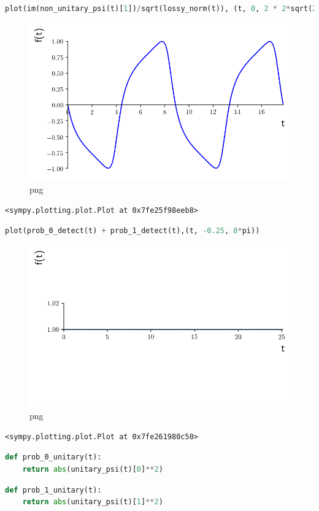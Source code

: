 \begin{lstlisting}[language=Python]
plot(im(non_unitary_psi(t)[1])/sqrt(lossy_norm(t)), (t, 0, 2 * 2*sqrt(2)*pi), line_color='b')
\end{lstlisting}

\begin{figure}
\centering
\includegraphics[width=0.6\linewidth]{output_37_0.png}
\caption{png}
\end{figure}

\begin{lstlisting}
<sympy.plotting.plot.Plot at 0x7fe25f98eeb8>
\end{lstlisting}

\begin{lstlisting}[language=Python]
plot(prob_0_detect(t) + prob_1_detect(t),(t, -0.25, 8*pi))
\end{lstlisting}

\begin{figure}
\centering
\includegraphics[width=0.6\linewidth]{output_38_0.png}
\caption{png}
\end{figure}

\begin{lstlisting}
<sympy.plotting.plot.Plot at 0x7fe261980c50>
\end{lstlisting}

\begin{lstlisting}[language=Python]
def prob_0_unitary(t):
    return abs(unitary_psi(t)[0]**2)
\end{lstlisting}

\begin{lstlisting}[language=Python]
def prob_1_unitary(t):
    return abs(unitary_psi(t)[1]**2)
\end{lstlisting}


